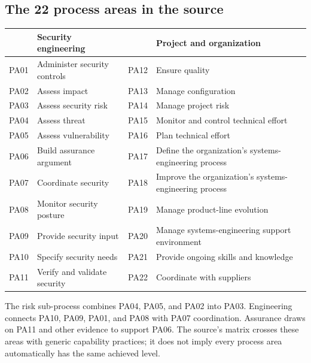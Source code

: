 \documentclass[11pt,a4paper]{article}
\numberwithin{figure}{section}
\begin{document}
\subsection{The 22 process areas in the source}
\begin{longtable}{@{}>{\raggedright\arraybackslash}p{12mm}>{\raggedright\arraybackslash}p{61mm}>{\raggedright\arraybackslash}p{12mm}>{\raggedright\arraybackslash}p{64mm}@{}}
\toprule & Security engineering & & Project and organization\\\midrule\endhead
PA01 & Administer security controls & PA12 & Ensure quality\\
PA02 & Assess impact & PA13 & Manage configuration\\
PA03 & Assess security risk & PA14 & Manage project risk\\
PA04 & Assess threat & PA15 & Monitor and control technical effort\\
PA05 & Assess vulnerability & PA16 & Plan technical effort\\
PA06 & Build assurance argument & PA17 & Define the organization's systems-engineering process\\
PA07 & Coordinate security & PA18 & Improve the organization's systems-engineering process\\
PA08 & Monitor security posture & PA19 & Manage product-line evolution\\
PA09 & Provide security input & PA20 & Manage systems-engineering support environment\\
PA10 & Specify security needs & PA21 & Provide ongoing skills and knowledge\\
PA11 & Verify and validate security & PA22 & Coordinate with suppliers\\\bottomrule
\end{longtable}
The risk sub-process combines PA04, PA05, and PA02 into PA03. Engineering connects PA10, PA09, PA01, and PA08 with PA07 coordination. Assurance draws on PA11 and other evidence to support PA06. The source's matrix crosses these areas with generic capability practices; it does not imply every process area automatically has the same achieved level.
\end{document}
